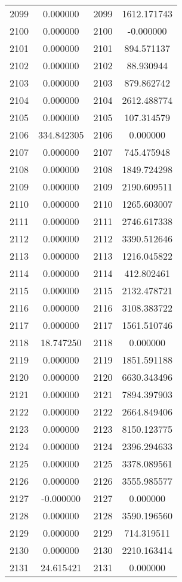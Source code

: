 \documentclass[12pt]{article}
\begin{document}
\begin{longtable}{@{}cccc@{}}
2099 & 0.000000 & 2099 & 1612.171743 \\
2100 & 0.000000 & 2100 & -0.000000 \\
2101 & 0.000000 & 2101 & 894.571137 \\
2102 & 0.000000 & 2102 & 88.930944 \\
2103 & 0.000000 & 2103 & 879.862742 \\
2104 & 0.000000 & 2104 & 2612.488774 \\
2105 & 0.000000 & 2105 & 107.314579 \\
2106 & 334.842305 & 2106 & 0.000000 \\
2107 & 0.000000 & 2107 & 745.475948 \\
2108 & 0.000000 & 2108 & 1849.724298 \\
2109 & 0.000000 & 2109 & 2190.609511 \\
2110 & 0.000000 & 2110 & 1265.603007 \\
2111 & 0.000000 & 2111 & 2746.617338 \\
2112 & 0.000000 & 2112 & 3390.512646 \\
2113 & 0.000000 & 2113 & 1216.045822 \\
2114 & 0.000000 & 2114 & 412.802461 \\
2115 & 0.000000 & 2115 & 2132.478721 \\
2116 & 0.000000 & 2116 & 3108.383722 \\
2117 & 0.000000 & 2117 & 1561.510746 \\
2118 & 18.747250 & 2118 & 0.000000 \\
2119 & 0.000000 & 2119 & 1851.591188 \\
2120 & 0.000000 & 2120 & 6630.343496 \\
2121 & 0.000000 & 2121 & 7894.397903 \\
2122 & 0.000000 & 2122 & 2664.849406 \\
2123 & 0.000000 & 2123 & 8150.123775 \\
2124 & 0.000000 & 2124 & 2396.294633 \\
2125 & 0.000000 & 2125 & 3378.089561 \\
2126 & 0.000000 & 2126 & 3555.985577 \\
2127 & -0.000000 & 2127 & 0.000000 \\
2128 & 0.000000 & 2128 & 3590.196560 \\
2129 & 0.000000 & 2129 & 714.319511 \\
2130 & 0.000000 & 2130 & 2210.163414 \\
2131 & 24.615421 & 2131 & 0.000000 \\

\end{longtable}
\end{document}
